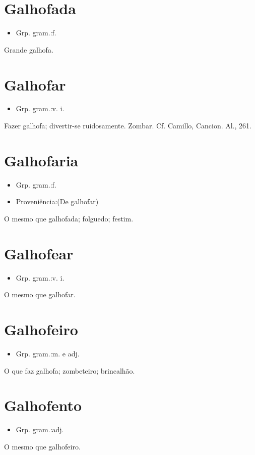 \section{Galhofada}
\begin{itemize}
\item {Grp. gram.:f.}
\end{itemize}
Grande galhofa.
\section{Galhofar}
\begin{itemize}
\item {Grp. gram.:v. i.}
\end{itemize}
Fazer galhofa; divertir-se ruidosamente.
Zombar. Cf. Camillo, \textunderscore Cancion. Al.\textunderscore , 261.
\section{Galhofaria}
\begin{itemize}
\item {Grp. gram.:f.}
\end{itemize}
\begin{itemize}
\item {Proveniência:(De \textunderscore galhofar\textunderscore )}
\end{itemize}
O mesmo que \textunderscore galhofada\textunderscore ; folguedo; festim.
\section{Galhofear}
\begin{itemize}
\item {Grp. gram.:v. i.}
\end{itemize}
O mesmo que \textunderscore galhofar\textunderscore .
\section{Galhofeiro}
\begin{itemize}
\item {Grp. gram.:m.  e  adj.}
\end{itemize}
O que faz galhofa; zombeteiro; brincalhão.
\section{Galhofento}
\begin{itemize}
\item {Grp. gram.:adj.}
\end{itemize}
O mesmo que \textunderscore galhofeiro\textunderscore .
